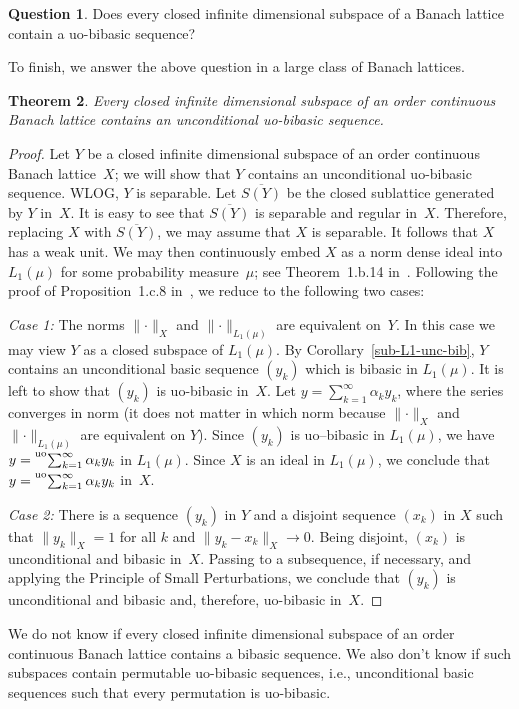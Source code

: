 \documentclass[12pt]{amsart}
\theoremstyle{plain}
\newtheorem{theorem}{Theorem}[section]
\theoremstyle{definition}
\newtheorem{question}[theorem]{Question}
\newcommand{\norm}[1]{\lVert#1\rVert}
\newcommand{\s}{\sum_{k=1}^\infty}
\newcommand{\tuos}{\prescript{{\rm uo}}{}{\sum_{k=1}^\infty\,}}
\begin{document}
\begin{question}
  Does every closed infinite dimensional subspace of a Banach lattice
  contain a uo-bibasic sequence?
\end{question}

To finish, we answer the above question in a large class of Banach lattices. 
\begin{theorem}\label{uo in subspace}
  Every closed infinite dimensional subspace of an order continuous
  Banach lattice contains an unconditional uo-bibasic sequence.
\end{theorem}

\begin{proof}
  Let $Y$ be a closed infinite dimensional subspace of an order
  continuous Banach lattice~$X$; we will show that $Y$ contains an
  unconditional uo-bibasic sequence. WLOG, $Y$ is separable. Let
  $\overline{S(Y)}$ be the closed sublattice generated by $Y$
  in~$X$. It is easy to see that $\overline{S(Y)}$ is separable and
  regular in~$X$. Therefore, replacing $X$ with $\overline{S(Y)}$, we
  may assume that $X$ is separable. It follows that $X$ has a weak
  unit.  We may then continuously embed $X$ as a norm dense ideal into
  $L_1(\mu)$ for some probability measure~$\mu$; see Theorem~1.b.14
  in~\cite{Lindenstrauss:79}.  Following the proof of
  Proposition~1.c.8 in~\cite{Lindenstrauss:79}, we reduce to the
  following two cases:

  \emph{Case 1:} The norms $\norm{\cdot}_X$ and
  $\norm{\cdot}_{L_1(\mu)}$ are equivalent on~$Y$. In this case we may
  view $Y$ as a closed subspace of $L_1(\mu)$. By
  Corollary~\ref{sub-L1-unc-bib}, $Y$ contains an unconditional basic
  sequence $(y_k)$ which is bibasic in $L_1(\mu)$. It is left to show
  that $(y_k)$ is uo-bibasic in~$X$. Let $y=\s\alpha_ky_k$, where the
  series converges in norm (it does not matter in which norm because
  $\norm{\cdot}_X$ and $\norm{\cdot}_{L_1(\mu)}$ are equivalent on
  $Y$). Since $(y_k)$ is uo--bibasic in $L_1(\mu)$, we have
  $y=\tuos\alpha_ky_k$ in $L_1(\mu)$. Since $X$ is an ideal in
  $L_1(\mu)$, we conclude that $y=\tuos\alpha_ky_k$ in~$X$.

  \emph{Case 2:} There is a sequence $(y_k)$ in $Y$ and a disjoint
  sequence $(x_k)$ in $X$ such that $\norm{y_k}_X=1$ for all $k$ and
  $\norm{y_k-x_k}_X\to 0$. Being disjoint,
  $(x_k)$ is unconditional and bibasic in~$X$. Passing to a
  subsequence, if necessary, and applying the Principle of Small
  Perturbations, we conclude that $(y_k)$ is unconditional and bibasic
  and, therefore, uo-bibasic in~$X$.
\end{proof}
We do not know if every closed infinite dimensional subspace of an
order continuous Banach lattice contains a bibasic sequence. We also
don't know if such subspaces contain permutable uo-bibasic sequences,
i.e., unconditional basic sequences such that every permutation is
uo-bibasic.
\end{document}
